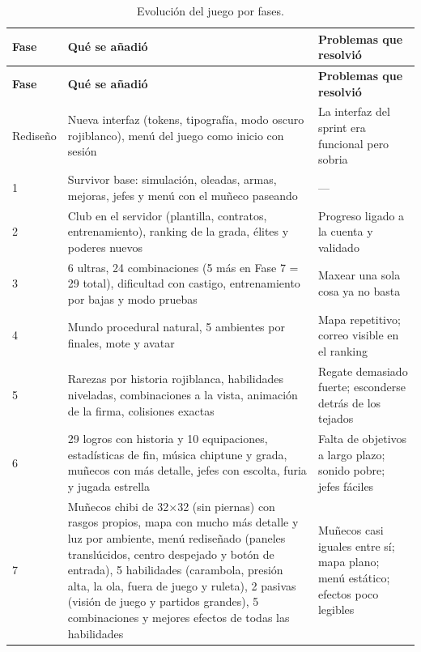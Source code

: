 \begin{longtable}{@{}L{1.2cm} L{5.6cm} L{5.2cm}@{}}
\caption{Evolución del juego por fases.}\label{tab:juego-fases}\\
\toprule
\textbf{Fase} & \textbf{Qué se añadió} & \textbf{Problemas que resolvió} \\ \midrule \endfirsthead
\toprule
\textbf{Fase} & \textbf{Qué se añadió} & \textbf{Problemas que resolvió} \\ \midrule \endhead
Rediseño & Nueva interfaz (tokens, tipografía, modo oscuro rojiblanco), menú del juego como inicio con sesión & La interfaz del sprint era funcional pero sobria \\
1 & Survivor base: simulación, oleadas, armas, mejoras, jefes y menú con el muñeco paseando & — \\
2 & Club en el servidor (plantilla, contratos, entrenamiento), ranking de la grada, élites y poderes nuevos & Progreso ligado a la cuenta y validado \\
3 & 6 ultras, 24 combinaciones (5 más en Fase 7 = 29 total), dificultad con castigo, entrenamiento por bajas y modo pruebas & Maxear una sola cosa ya no basta \\
4 & Mundo procedural natural, 5 ambientes por finales, mote y avatar & Mapa repetitivo; correo visible en el ranking \\
5 & Rarezas por historia rojiblanca, habilidades niveladas, combinaciones a la vista, animación de la firma, colisiones exactas & Regate demasiado fuerte; esconderse detrás de los tejados \\
6 & 29 logros con historia y 10 equipaciones, estadísticas de fin, música chiptune y grada, muñecos con más detalle, jefes con escolta, furia y jugada estrella & Falta de objetivos a largo plazo; sonido pobre; jefes fáciles \\
7 & Muñecos chibi de 32$\times$32 (sin piernas) con rasgos propios, mapa con mucho más detalle y luz por ambiente, menú rediseñado (paneles translúcidos, centro despejado y botón de entrada), 5 habilidades (carambola, presión alta, la ola, fuera de juego y ruleta), 2 pasivas (visión de juego y partidos grandes), 5 combinaciones y mejores efectos de todas las habilidades & Muñecos casi iguales entre sí; mapa plano; menú estático; efectos poco legibles \\*
\bottomrule
\end{longtable}
